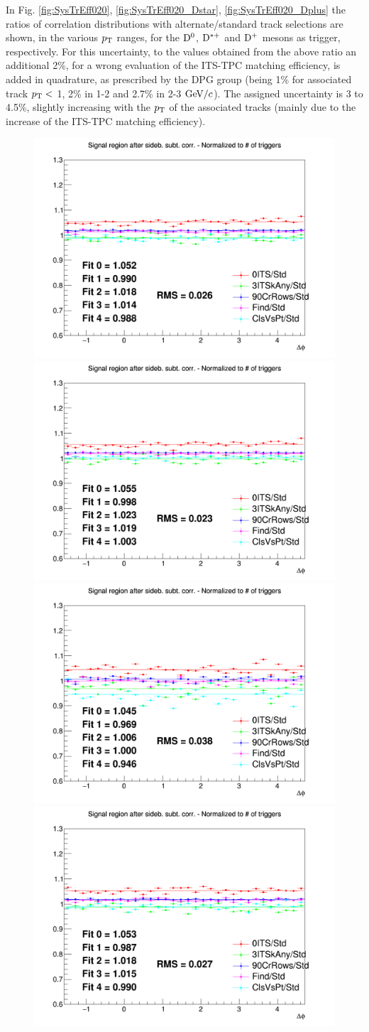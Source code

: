 In Fig. \ref{fig:SysTrEff020}, \ref{fig:SysTrEff020_Dstar}, \ref{fig:SysTrEff020_Dplus} the ratios of correlation distributions with alternate/standard track selections are shown, in the various $p_{\rm T}$ ranges, for the ${\rm D^0}$, ${\rm D^{*+}}$ and ${\rm D^+}$ mesons as trigger, respectively.
For this uncertainty, to the values obtained from the above ratio an additional 2\%, for a wrong evaluation of the ITS-TPC matching efficiency, is added in quadrature, as prescribed by the DPG group (being 1\% for associated track $p_{\rm T} <$ 1, 2\% in 1-2 and 2.7\% in 2-3 $\mathrm{GeV}/c$).
The assigned uncertainty is 3 to 4.5\%, slightly increasing with the $p_{\rm T}$ of the associated tracks (mainly due to the increase of the ITS-TPC matching efficiency).

\begin{figure}
\centering
{\includegraphics[width=0.31\linewidth]{figures/Systematics/Dzero/TrackCut/Ratio_AzimCorrDistr_Dzero_Canvas_PtIntBins4to5_PoolInt_thr03to99.png}}
{\includegraphics[width=0.31\linewidth]{figures/Systematics/Dzero/TrackCut/Ratio_AzimCorrDistr_Dzero_Canvas_PtIntBins4to5_PoolInt_thr03to1.png}}
{\includegraphics[width=0.31\linewidth]{figures/Systematics/Dzero/TrackCut/Ratio_AzimCorrDistr_Dzero_Canvas_PtIntBins4to5_PoolInt_thr1to99.png}} \\
{\includegraphics[width=0.31\linewidth]{figures/Systematics/Dzero/TrackCut/Ratio_AzimCorrDistr_Dzero_Canvas_PtIntBins6to8_PoolInt_thr03to99.png}}

\end{figure}
